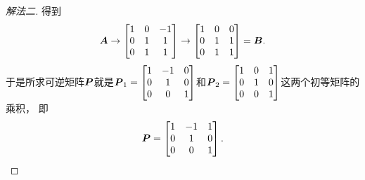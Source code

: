 \begin{example}
\begin{solution}
\begin{proof}[解法二]
得到\begin{equation*}
	\boldsymbol{A} \to \begin{bmatrix}
		1 & 0 & -1 \\
		0 & 1 & 1 \\
		0 & 1 & 1
	\end{bmatrix}
	\to \begin{bmatrix}
		1 & 0 & 0 \\
		0 & 1 & 1 \\
		0 & 1 & 1
	\end{bmatrix}
	= \boldsymbol{B}.
\end{equation*}
于是所求可逆矩阵\(\boldsymbol{P}\)就是\(\boldsymbol{P}_1 = \begin{bmatrix}
	1 & -1 & 0 \\
	0 & 1 & 0 \\
	0 & 0 & 1
\end{bmatrix}\)和\(\boldsymbol{P}_2 = \begin{bmatrix}
	1 & 0 & 1 \\
	0 & 1 & 0 \\
	0 & 0 & 1
\end{bmatrix}\)这两个初等矩阵的乘积，
即\begin{equation*}
	\boldsymbol{P} = \begin{bmatrix}
		1 & -1 & 1 \\
		0 & 1 & 0 \\
		0 & 0 & 1
	\end{bmatrix}.
\end{equation*}
\end{proof}
\end{solution}
\end{example}

